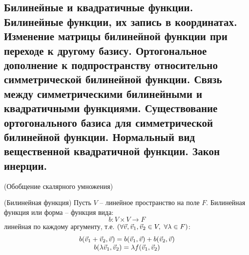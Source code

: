 \begin{multicols}{2}
\section{Билинейные и квадратичные функции. Билинейные функции, их запись в координатах.
Изменение матрицы билинейной функции при переходе к другому базису.
Ортогональное дополнение к подпространству относительно симметрической
билинейной функции. Связь между симметрическими билинейными и квадратичными
функциями. Существование ортогонального базиса для симметрической билинейной
функции. Нормальный вид вещественной квадратичной функции. Закон инерции.} 
(Обобщение скалярного умножения)
\begin{definition}{(Билинейная функция)}{}
    Пусть $V$ -- линейное пространство на поле $F$. Билинейная функция или форма -- функция вида:
    \[
        b: V\times V \to F
    \]
    линейная по каждому аргументу, т.е. $(\forall \vec{v}, \vec{v}_1, \vec{v}_2 \in V, \ \forall \lambda \in F)$:
    \[
      \begin{array}{c}
        b(\vec{v}_1 + \vec{v}_2, \vec{v}) = b(\vec{v}_1, \vec{v}) + b(\vec{v}_2, \vec{v})\\
        b(\lambda \vec{v}_1, \vec{v}_2) = \lambda f(\vec{v}_1, \vec{v}_2)
      \end{array}  
    \]
\end{definition}

\end{multicols}
